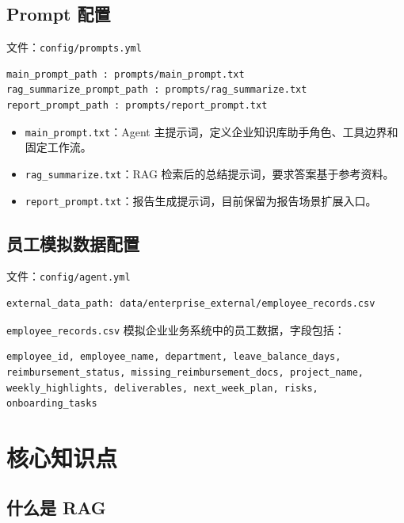 \documentclass[UTF8,zihao=-4]{ctexart}
\begin{document}
\subsection{Prompt 配置}

文件：\texttt{config/prompts.yml}

\begin{Verbatim}[breaklines=true,breakanywhere=true,fontsize=\small]
main_prompt_path : prompts/main_prompt.txt
rag_summarize_prompt_path : prompts/rag_summarize.txt
report_prompt_path : prompts/report_prompt.txt
\end{Verbatim}

\begin{itemize}
\item \texttt{main\_prompt.txt}：Agent 主提示词，定义企业知识库助手角色、工具边界和固定工作流。
\item \texttt{rag\_summarize.txt}：RAG 检索后的总结提示词，要求答案基于参考资料。
\item \texttt{report\_prompt.txt}：报告生成提示词，目前保留为报告场景扩展入口。
\end{itemize}

\subsection{员工模拟数据配置}

文件：\texttt{config/agent.yml}

\begin{Verbatim}[breaklines=true,breakanywhere=true,fontsize=\small]
external_data_path: data/enterprise_external/employee_records.csv
\end{Verbatim}

\texttt{employee\_records.csv} 模拟企业业务系统中的员工数据，字段包括：

\begin{Verbatim}[breaklines=true,breakanywhere=true,fontsize=\small]
employee_id, employee_name, department, leave_balance_days,
reimbursement_status, missing_reimbursement_docs, project_name,
weekly_highlights, deliverables, next_week_plan, risks, onboarding_tasks
\end{Verbatim}

\section{核心知识点}

\subsection{什么是 RAG}
\end{document}
